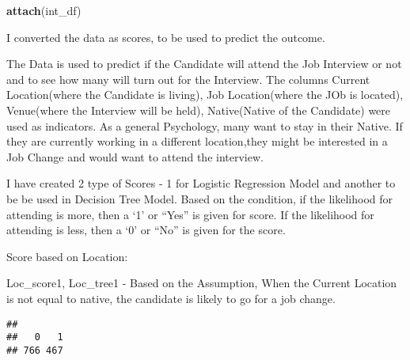 \documentclass[]{article}
\newenvironment{Shaded}{\begin{snugshade}}{\end{snugshade}}
\newcommand{\KeywordTok}[1]{\textcolor[rgb]{0.13,0.29,0.53}{\textbf{#1}}}
\newcommand{\DecValTok}[1]{\textcolor[rgb]{0.00,0.00,0.81}{#1}}
\newcommand{\StringTok}[1]{\textcolor[rgb]{0.31,0.60,0.02}{#1}}
\newcommand{\CommentTok}[1]{\textcolor[rgb]{0.56,0.35,0.01}{\textit{#1}}}
\newcommand{\ControlFlowTok}[1]{\textcolor[rgb]{0.13,0.29,0.53}{\textbf{#1}}}
\newcommand{\OperatorTok}[1]{\textcolor[rgb]{0.81,0.36,0.00}{\textbf{#1}}}
\newcommand{\NormalTok}[1]{#1}
\begin{document}
\begin{Shaded}
\begin{Highlighting}[]
\KeywordTok{attach}\NormalTok{(int_df)}
\end{Highlighting}
\end{Shaded}

I converted the data as scores, to be used to predict the outcome.

The Data is used to predict if the Candidate will attend the Job
Interview or not and to see how many will turn out for the Interview.
The columns Current Location(where the Candidate is living), Job
Location(where the JOb is located), Venue(where the Interview will be
held), Native(Native of the Candidate) were used as indicators. As a
general Psychology, many want to stay in their Native. If they are
currently working in a different location,they might be interested in a
Job Change and would want to attend the interview.

I have created 2 type of Scores - 1 for Logistic Regression Model and
another to be be used in Decision Tree Model. Based on the condition, if
the likelihood for attending is more, then a `1' or ``Yes'' is given for
score. If the likelihood for attending is less, then a `0' or ``No'' is
given for the score.

Score based on Location:

Loc\_score1, Loc\_tree1 - Based on the Assumption, When the Current
Location is not equal to native, the candidate is likely to go for a job
change.

\begin{Shaded}
\end{Shaded}

\begin{verbatim}
## 
##   0   1 
## 766 467
\end{verbatim}
\end{document}

